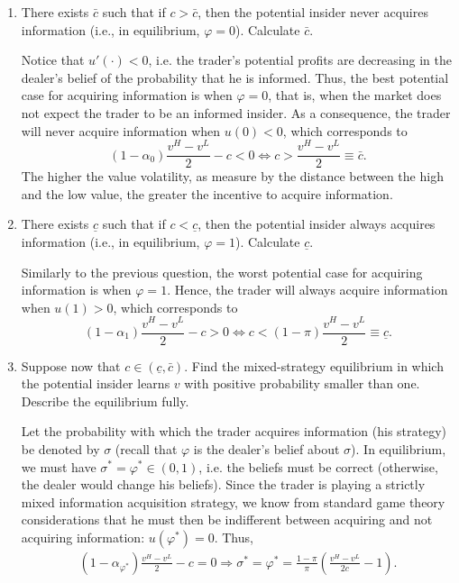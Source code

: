 \documentclass[11pt
, answers
]{exam}
\begin{document}
\begin{enumerate} [label=(\alph*). ]
\item There exists $\bar{c}$ such that if $c > \bar{c}$, then the potential insider never acquires information (i.e., in equilibrium, $\varphi=0$). Calculate $\bar{c}$.

\begin{solution}
	Notice that $u'(\cdot)<0$, i.e. the trader's potential profits are decreasing in the dealer's belief of the probability that he is informed. Thus, the best potential case for acquiring information is when $\varphi=0$, that is, when the market does not expect the trader to be an informed insider. As a consequence, the trader will never acquire information when $u(0) < 0$, which corresponds to
	\[
	(1-\alpha_0)\frac{v^H-v^L}{2}-c <0 \Leftrightarrow c > \frac{v^H-v^L}{2} \equiv \bar{c}.
	\]
	The higher the value volatility, as measure by the distance between the high and the low value, the greater the incentive to acquire information.
\end{solution}


\item There exists $\underline{c}$ such that if $c < \underline{c}$, then the potential insider always acquires information (i.e., in equilibrium, $\varphi=1$). Calculate $\underline{c}$.

\begin{solution}
	Similarly to the previous question, the worst potential case for acquiring information is when $\varphi=1$. Hence, the trader will always acquire information when $u(1) > 0$, which corresponds to
	\[
	(1-\alpha_1)\frac{v^H-v^L}{2}-c > 0 \Leftrightarrow c < (1-\pi) \frac{v^H-v^L}{2} \equiv \underline{c}.
	\]
\end{solution}


\item Suppose now that $c \in (\underline{c}, \bar{c})$. Find the mixed-strategy equilibrium in which the potential insider learns $v$ with positive probability smaller than one. Describe the equilibrium fully.

\begin{solution}
	Let the probability with which the trader acquires information (his strategy) be denoted by $\sigma$ (recall that $\varphi$ is the dealer's belief about $\sigma$). In equilibrium, we must have $\sigma^*=\varphi^* \in (0,1)$, i.e. the beliefs must be correct (otherwise, the dealer would change his beliefs). Since the trader is playing a strictly mixed information acquisition strategy, we know from standard game theory considerations that he must then be indifferent between acquiring and not acquiring information: $u(\varphi^*)=0$. Thus,
	\begin{align}
		\label{eq:phistar}
		(1-\alpha_{\varphi^*})\frac{v^H-v^L}{2}-c = 0 \Rightarrow \sigma^*=\varphi^* = \frac{1-\pi}{\pi} \left(\frac{v^H-v^L}{2c} -1 \right).
	\end{align}
	

\end{solution}
\end{enumerate}
\end{document}
